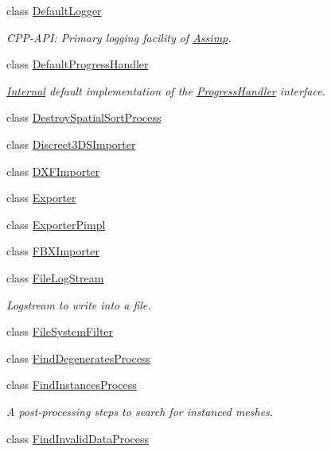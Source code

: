\begin{DoxyCompactItemize}
\item 
class \hyperlink{class_assimp_1_1_default_logger}{Default\+Logger}
\begin{DoxyCompactList}\small\item\em C\+P\+P-\/\+A\+P\+I\+: Primary logging facility of \hyperlink{class_assimp}{Assimp}. \end{DoxyCompactList}\item 
class \hyperlink{class_assimp_1_1_default_progress_handler}{Default\+Progress\+Handler}
\begin{DoxyCompactList}\small\item\em \hyperlink{struct_internal}{Internal} default implementation of the \hyperlink{class_progress_handler}{Progress\+Handler} interface. \end{DoxyCompactList}\item 
class \hyperlink{class_assimp_1_1_destroy_spatial_sort_process}{Destroy\+Spatial\+Sort\+Process}
\item 
class \hyperlink{class_assimp_1_1_discreet3_d_s_importer}{Discreet3\+D\+S\+Importer}
\item 
class \hyperlink{class_assimp_1_1_d_x_f_importer}{D\+X\+F\+Importer}
\item 
class \hyperlink{class_assimp_1_1_exporter}{Exporter}
\item 
class \hyperlink{class_assimp_1_1_exporter_pimpl}{Exporter\+Pimpl}
\item 
class \hyperlink{class_assimp_1_1_f_b_x_importer}{F\+B\+X\+Importer}
\item 
class \hyperlink{class_assimp_1_1_file_log_stream}{File\+Log\+Stream}
\begin{DoxyCompactList}\small\item\em Logstream to write into a file. \end{DoxyCompactList}\item 
class \hyperlink{class_assimp_1_1_file_system_filter}{File\+System\+Filter}
\item 
class \hyperlink{class_assimp_1_1_find_degenerates_process}{Find\+Degenerates\+Process}
\item 
class \hyperlink{class_assimp_1_1_find_instances_process}{Find\+Instances\+Process}
\begin{DoxyCompactList}\small\item\em A post-\/processing steps to search for instanced meshes. \end{DoxyCompactList}\item 
class \hyperlink{class_assimp_1_1_find_invalid_data_process}{Find\+Invalid\+Data\+Process}

\end{DoxyCompactItemize}

